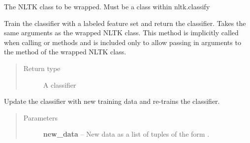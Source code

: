 \documentclass[letterpaper,10pt,english]{sphinxmanual}
\begin{document}
\begin{fulllineitems}
\begin{fulllineitems}
\label{api_reference:textblob.classifiers.NLTKClassifier.nltk_class}
The NLTK class to be wrapped. Must be a class within nltk.classify

\end{fulllineitems}


\begin{fulllineitems}
\label{api_reference:textblob.classifiers.NLTKClassifier.train}
Train the classifier with a labeled feature set and return
the classifier. Takes the same arguments as the wrapped NLTK class.
This method is implicitly called when calling  or
 methods and is included only to allow passing in arguments
to the  method of the wrapped NLTK class.

\begin{quote}\begin{description}
\item[{Return type}] \leavevmode
A classifier

\end{description}\end{quote}

\end{fulllineitems}


\begin{fulllineitems}
\label{api_reference:textblob.classifiers.NLTKClassifier.update}
Update the classifier with new training data and re-trains the
classifier.
\begin{quote}\begin{description}
\item[{Parameters}] \leavevmode
\textbf{new\_data} -- New data as a list of tuples of the form
.

\end{description}\end{quote}

\end{fulllineitems}


\end{fulllineitems}
\end{document}
